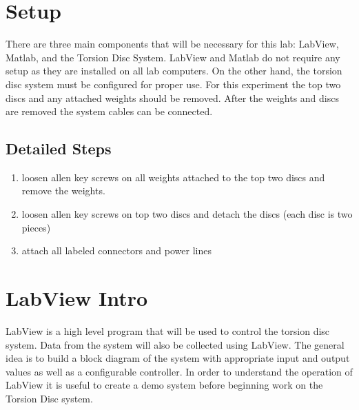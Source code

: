 \documentclass[11pt,titlepage]{article}
\begin{document}
\section{Setup}
	There are three main components that will be necessary for this lab: LabView, Matlab, and the Torsion Disc System. LabView and Matlab do not require any setup as they are installed on all lab computers. On the other hand, the torsion disc system must be configured for proper use. For this experiment the top two discs and any attached weights should be removed. After the weights and discs are removed the system cables can be connected.
	\subsection*{Detailed Steps}
	\begin{enumerate}
		\item loosen allen key screws on all weights attached to the top two discs and remove the weights.
		\item loosen allen key screws on top two discs and detach the discs (each disc is two pieces)
		\item attach all labeled connectors and power lines
	\end{enumerate}

\section{LabView Intro}
	LabView is a high level program that will be used to control the torsion disc system. Data from the system will also be collected using LabView. The general idea is to build a block diagram of the system with appropriate input and output values as well as a configurable controller. In order to understand the operation of LabView it is useful to create a demo system before beginning work on the Torsion Disc system.
\end{document}
